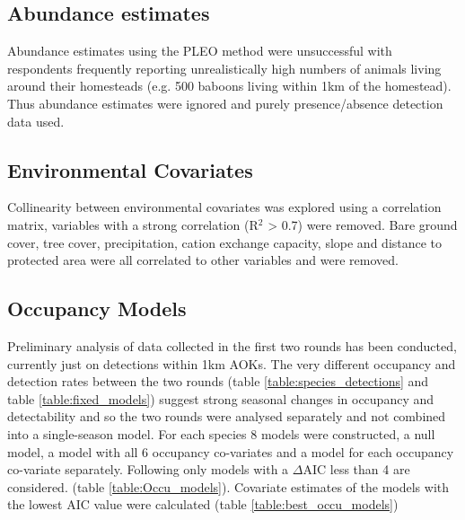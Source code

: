 \subsection*{Abundance estimates}
Abundance estimates using the PLEO method were unsuccessful with respondents frequently reporting unrealistically high numbers of animals living around their homesteads (e.g. 500 baboons living within 1km of the homestead). Thus abundance estimates were ignored and purely presence/absence detection data used.

\subsection*{Environmental Covariates}

Collinearity between environmental covariates was explored using a correlation matrix, variables with a strong correlation (R$^2$ > 0.7) were removed. Bare ground cover, tree cover, precipitation, cation exchange capacity, slope and distance to protected area were all correlated to other variables and were removed.

\subsection*{Occupancy Models}
Preliminary analysis of data collected in the first two rounds has been conducted, currently just on detections within 1km AOKs. The very different occupancy and detection rates between the two rounds (table \ref{table:species_detections} and table \ref{table:fixed_models}) suggest strong seasonal changes in occupancy and detectability and so the two rounds were analysed separately and not combined into a single-season model. For each species 8 models were constructed, a null model, a model with all 6 occupancy co-variates and a model for each occupancy co-variate separately. Following \citet{Burnham2002} only models with a $\Delta$AIC less than 4 are considered. (table \ref{table:Occu_models}). Covariate estimates of the models with the lowest AIC value were calculated (table \ref{table:best_occu_models})

